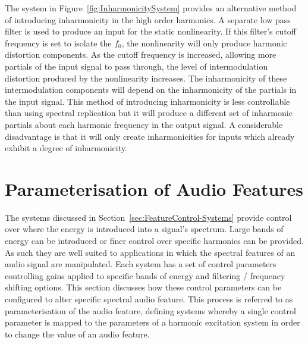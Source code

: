 		The system in Figure~\ref{fig:InharmonicitySystem} provides an alternative method of introducing
		inharmonicity in the high order harmonics. A separate low pass filter is used to produce an input for the
		static nonlinearity. If this filter's cutoff frequency is set to isolate the $f_{0}$, the nonlinearity will
		only produce harmonic distortion components. As the cutoff frequency is increased, allowing more partials
		of the input signal to pass through, the level of intermodulation distortion produced by the nonlinearity
		increases. The inharmonicity of these intermodulation components will depend on the inharmonicity of the
		partials in the input signal. This method of introducing inharmonicity is less controllable than using
		spectral replication but it will produce a different set of inharmonic partials about each harmonic
		frequency in the output signal. A considerable disadvantage is that it will only create inharmonicities for
		inputs which already exhibit a degree of inharmonicity.

\section{Parameterisation of Audio Features}
\label{sec:FeatureControl-Parameterisation}
	The systems discussed in Section~\ref{sec:FeatureControl-Systems} provide control over where the energy is
	introduced into a signal's spectrum. Large bands of energy can be introduced or finer control over specific
	harmonics can be provided. As such they are well suited to applications in which the spectral features of an audio
	signal are manipulated. Each system has a set of control parameters controlling gains applied to specific bands of
	energy and filtering / frequency shifting options. This section discusses how these control parameters can be
	configured to alter specific spectral audio feature. This process is referred to as parameterisation of the audio
	feature, defining systems whereby a single control parameter is mapped to the parameters of a harmonic excitation
	system in order to change the value of an audio feature.

